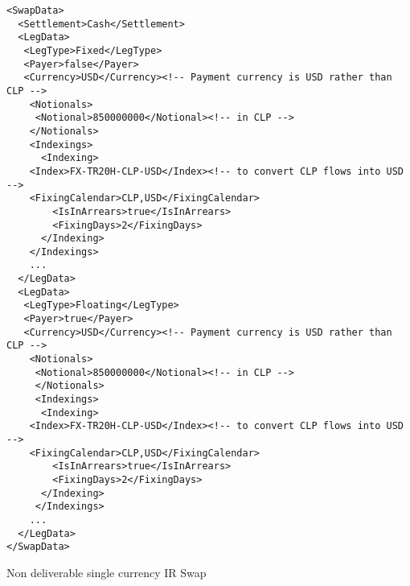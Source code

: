 \begin{listing}[H]
\begin{verbatim}
<SwapData>
  <Settlement>Cash</Settlement>
  <LegData>
   <LegType>Fixed</LegType>
   <Payer>false</Payer>  
   <Currency>USD</Currency><!-- Payment currency is USD rather than CLP -->
    <Notionals>
     <Notional>850000000</Notional><!-- in CLP -->
    </Notionals>
    <Indexings>
      <Indexing>
	<Index>FX-TR20H-CLP-USD</Index><!-- to convert CLP flows into USD -->
	<FixingCalendar>CLP,USD</FixingCalendar>
        <IsInArrears>true</IsInArrears>
        <FixingDays>2</FixingDays>
      </Indexing>
    </Indexings> 
    ...
  </LegData>
  <LegData>
   <LegType>Floating</LegType>
   <Payer>true</Payer>  
   <Currency>USD</Currency><!-- Payment currency is USD rather than CLP -->
    <Notionals>
     <Notional>850000000</Notional><!-- in CLP -->
     </Notionals>
     <Indexings>
      <Indexing>
	<Index>FX-TR20H-CLP-USD</Index><!-- to convert CLP flows into USD -->
	<FixingCalendar>CLP,USD</FixingCalendar>
        <IsInArrears>true</IsInArrears>
        <FixingDays>2</FixingDays>
      </Indexing>
     </Indexings>     
    ...    
  </LegData>
</SwapData>
\end{verbatim}
\caption{Non deliverable single currency IR Swap}
\label{lst:ndir_swap}
\end{listing}
